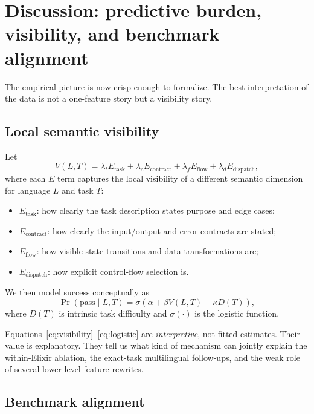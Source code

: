 \documentclass[11pt]{article}
\newcommand{\elixir}{Elixir}
\begin{document}
\section{Discussion: predictive burden, visibility, and benchmark alignment}

The empirical picture is now crisp enough to formalize. The best interpretation of the data is not a one-feature story but a visibility story.

\subsection{Local semantic visibility}

Let
\begin{equation}
V(L,T) = \lambda_t E_{\mathrm{task}} + \lambda_c E_{\mathrm{contract}} + \lambda_f E_{\mathrm{flow}} + \lambda_d E_{\mathrm{dispatch}},
\label{eq:visibility}
\end{equation}
where each $E$ term captures the local visibility of a different semantic dimension for language $L$ and task $T$:
\begin{itemize}
  \item $E_{\mathrm{task}}$: how clearly the task description states purpose and edge cases;
  \item $E_{\mathrm{contract}}$: how clearly the input/output and error contracts are stated;
  \item $E_{\mathrm{flow}}$: how visible state transitions and data transformations are;
  \item $E_{\mathrm{dispatch}}$: how explicit control-flow selection is.
\end{itemize}

We then model success conceptually as
\begin{equation}
\Pr(\mathrm{pass} \mid L,T) = \sigma\!\left(\alpha + \beta V(L,T) - \kappa D(T)\right),
\label{eq:logistic}
\end{equation}
where $D(T)$ is intrinsic task difficulty and $\sigma(\cdot)$ is the logistic function.

Equations~\eqref{eq:visibility}--\eqref{eq:logistic} are \emph{interpretive}, not fitted estimates. Their value is explanatory. They tell us what kind of mechanism can jointly explain the within-\elixir{} ablation, the exact-task multilingual follow-ups, and the weak role of several lower-level feature rewrites.

\subsection{Benchmark alignment}
\end{document}
